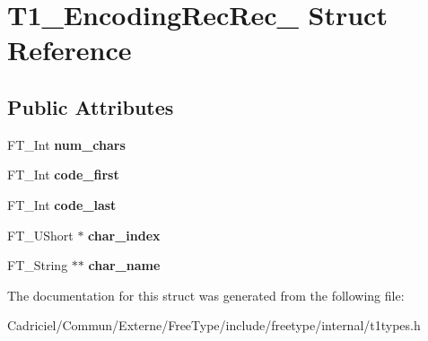 \hypertarget{struct_t1___encoding_rec_rec__}{}\section{T1\+\_\+\+Encoding\+Rec\+Rec\+\_\+ Struct Reference}
\label{struct_t1___encoding_rec_rec__}
\subsection*{Public Attributes}
\begin{DoxyCompactItemize}
\item 
F\+T\+\_\+\+Int {\bfseries num\+\_\+chars}\hypertarget{struct_t1___encoding_rec_rec___af1468d5bad99cccebeb0387713999e9c}{}\label{struct_t1___encoding_rec_rec___af1468d5bad99cccebeb0387713999e9c}

\item 
F\+T\+\_\+\+Int {\bfseries code\+\_\+first}\hypertarget{struct_t1___encoding_rec_rec___ae21aad8cbb10c8fd94e9f30c60542662}{}\label{struct_t1___encoding_rec_rec___ae21aad8cbb10c8fd94e9f30c60542662}

\item 
F\+T\+\_\+\+Int {\bfseries code\+\_\+last}\hypertarget{struct_t1___encoding_rec_rec___a9be1faadf0ce11d12d3bce600e1f2a9d}{}\label{struct_t1___encoding_rec_rec___a9be1faadf0ce11d12d3bce600e1f2a9d}

\item 
F\+T\+\_\+\+U\+Short $\ast$ {\bfseries char\+\_\+index}\hypertarget{struct_t1___encoding_rec_rec___a0c00a7b5c5ec7ba5eba667252f11f199}{}\label{struct_t1___encoding_rec_rec___a0c00a7b5c5ec7ba5eba667252f11f199}

\item 
F\+T\+\_\+\+String $\ast$$\ast$ {\bfseries char\+\_\+name}\hypertarget{struct_t1___encoding_rec_rec___acf21f77cff90336fb9f297799aaf26eb}{}\label{struct_t1___encoding_rec_rec___acf21f77cff90336fb9f297799aaf26eb}

\end{DoxyCompactItemize}


The documentation for this struct was generated from the following file\+:\begin{DoxyCompactItemize}
\item 
Cadriciel/\+Commun/\+Externe/\+Free\+Type/include/freetype/internal/t1types.\+h\end{DoxyCompactItemize}
